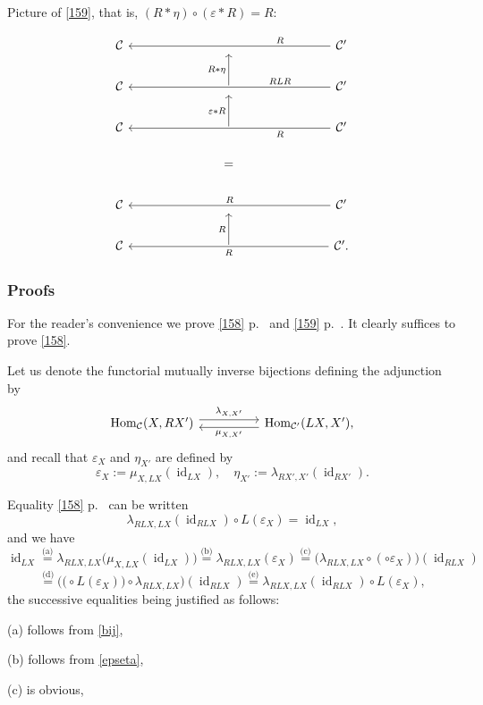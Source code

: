 \documentclass[12pt]{article}
\theoremstyle{remark}
\theoremstyle{definition}
\newcommand{\C}{\mathcal C}
\newcommand{\ee}{\varepsilon}
\DeclareMathOperator{\id}{id}
\DeclareMathOperator{\Hom}{Hom}
\begin{document}
Picture of \eqref{159}, that is, $(R*\eta)\circ(\ee*R)=R$:

$$
\begin{tikzcd}
%
\C&&&{}&&&\C'\ar{llllll}[near start,swap]{R}\\
%
\C&&&\ar{u}{R*\eta}&&&\C'\ar{llllll}[near start,swap]{RLR}\\
%
\C&&&\ar{u}{\ee*R}&&&\C'\ar{llllll}[near start]{R}\\ 
%
&&&=\\ 
%
\C&&&{}&&&\C'\ar{llllll}[swap]{R}\\ 
%
\C&&&\ar{u}{R}&&&\C'.\ar{llllll}{R}
%
\end{tikzcd}
$$

\subsubsection{Proofs}

For the reader's convenience we prove \eqref{158} p.~\pageref{158} and \eqref{159} p.~\pageref{159}. It clearly suffices to prove \eqref{158}. 

Let us denote the functorial mutually inverse bijections defining the adjunction by 
%
\begin{equation}\label{bij}
\begin{tikzcd}
\Hom_\C(X,RX')\ar[yshift=0.7ex]{rr}{\lambda_{X,X'}}&&\Hom_{\C'}(LX,X'),\ar[yshift=-0.7ex]{ll}{\mu_{X,X'}}
\end{tikzcd}
\end{equation} 
%
and recall that $\ee_X$ and $\eta_{X'}$ are defined by
%
\begin{equation}\label{epseta}
\ee_X:=\mu_{X,LX}(\id_{LX}),\quad\eta_{X'}:=\lambda_{RX',X'}(\id_{RX'}).
\end{equation}

Equality \eqref{158} p.~\pageref{158} can be written 
$$
\lambda_{RLX,LX}(\id_{RLX})\circ L(\ee_X)=\id_{LX},
$$ 
and we have 
$$
\id_{LX}\overset{\text{(a)}}{=}\lambda_{RLX,LX}\big(\mu_{X,LX}(\id_{LX})\big)\overset{\text{(b)}}{=}\lambda_{RLX,LX}(\ee_X)\overset{\text{(c)}}{=}\big(\lambda_{RLX,LX}\circ(\circ\ee_X)\big)(\id_{RLX})
$$
$$
\overset{\text{(d)}}{=}\Big(\big(\circ L(\ee_X)\big)\circ\lambda_{RLX,LX}\Big)(\id_{RLX})\overset{\text{(e)}}{=}\lambda_{RLX,LX}(\id_{RLX})\circ L(\ee_X),
$$ 
the successive equalities being justified as follows:

(a) follows from \eqref{bij},

(b) follows from \eqref{epseta},

(c) is obvious,
\end{document}
